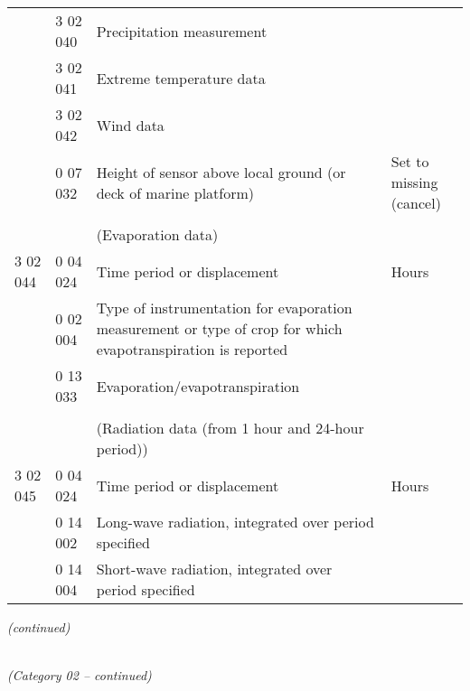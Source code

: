 \begin{longtable}[]{@{}llll@{}}
& 3 02 040 & Precipitation measurement &\tabularnewline
& 3 02 041 & Extreme temperature data &\tabularnewline
& 3 02 042 & Wind data &\tabularnewline
& 0 07 032 & Height of sensor above local ground (or deck of marine platform) & Set to missing (cancel)\tabularnewline
& & &\tabularnewline
& & (Evaporation data) &\tabularnewline
3 02 044 & 0 04 024 & Time period or displacement & Hours\tabularnewline
& 0 02 004 & Type of instrumentation for evaporation measurement or type of crop for which evapotranspiration is reported &\tabularnewline
& 0 13 033 & Evaporation/evapotranspiration &\tabularnewline
& & &\tabularnewline
& & (Radiation data (from 1 hour and 24-hour period)) &\tabularnewline
3 02 045 & 0 04 024 & Time period or displacement & Hours\tabularnewline
& 0 14 002 & Long-wave radiation, integrated over period specified &\tabularnewline
& 0 14 004 & Short-wave radiation, integrated over period specified &\tabularnewline
\bottomrule
\end{longtable}

\emph{(continued)}

\emph{\\
(Category 02 -- continued)}


